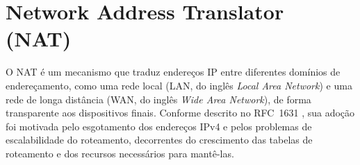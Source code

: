 \section{Network Address Translator (NAT)}
\label{sec:network_address_translator}

O NAT é um mecanismo que traduz endereços IP entre diferentes domínios de endereçamento, como uma rede local (LAN, do inglês \textit{Local Area Network}) e uma rede de longa distância (WAN, do inglês \textit{Wide Area Network}), de forma transparente aos dispositivos finais. Conforme descrito no RFC~1631 \citep{RFC1631}, sua adoção foi motivada pelo esgotamento dos endereços IPv4 e pelos problemas de escalabilidade do roteamento, decorrentes do crescimento das tabelas de roteamento e dos recursos necessários para mantê-las.

